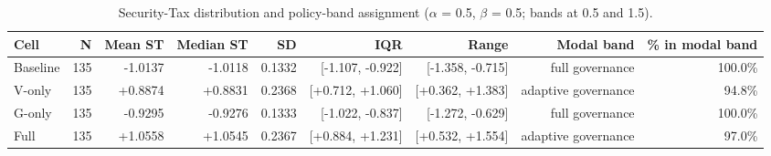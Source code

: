 \begin{table}[htbp]
\centering
\small
\caption{Security-Tax distribution and policy-band assignment ($\alpha$ = 0.5, $\beta$ = 0.5; bands at 0.5 and 1.5).}
\label{tab:gmais-6}
\begin{tabular}{lrrrrrrrr}
\toprule
Cell & N & Mean ST & Median ST & SD & IQR & Range & Modal band & \% in modal band \\
\midrule
Baseline & 135 & -1.0137 & -1.0118 & 0.1332 & [-1.107, -0.922] & [-1.358, -0.715] & full governance & 100.0\% \\
V-only & 135 & +0.8874 & +0.8831 & 0.2368 & [+0.712, +1.060] & [+0.362, +1.383] & adaptive governance & 94.8\% \\
G-only & 135 & -0.9295 & -0.9276 & 0.1333 & [-1.022, -0.837] & [-1.272, -0.629] & full governance & 100.0\% \\
Full & 135 & +1.0558 & +1.0545 & 0.2367 & [+0.884, +1.231] & [+0.532, +1.554] & adaptive governance & 97.0\% \\
\bottomrule
\end{tabular}
\end{table}
